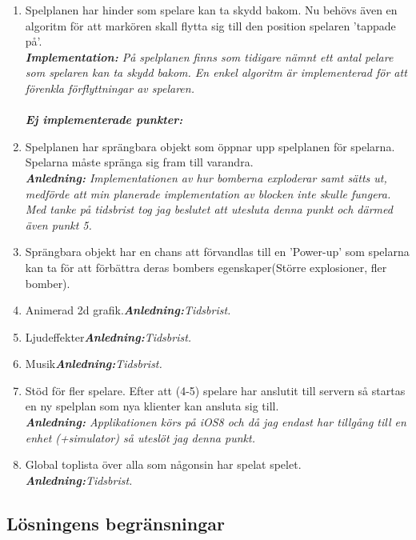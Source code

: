 \documentclass[10pt, titlepage, oneside, a4paper]{article}
\begin{document}
\begin{enumerate}
			
			\item Spelplanen har hinder som spelare kan ta skydd bakom. Nu behövs även en algoritm för att markören skall flytta sig till den position spelaren 'tappade på'.\\\textit{\textbf{Implementation:} På spelplanen finns som tidigare nämnt ett antal pelare som spelaren kan ta skydd bakom. En enkel algoritm är implementerad för att förenkla förflyttningar av spelaren.}
			\\\\\textit{\textbf{Ej implementerade punkter:}}
			\item Spelplanen har sprängbara objekt som öppnar upp spelplanen för spelarna. Spelarna måste spränga sig fram till varandra.\\\textit{\textbf{Anledning:} Implementationen av hur bomberna exploderar samt sätts ut, medförde att min planerade implementation av blocken inte skulle fungera. Med tanke på tidsbrist tog jag beslutet att utesluta denna punkt och därmed även punkt 5.}
			\item Sprängbara objekt har en chans att förvandlas till en 'Power-up' som spelarna kan ta för att förbättra deras bombers egenskaper(Större explosioner, fler bomber).
			\item Animerad 2d grafik.\textit{\textbf{Anledning:}Tidsbrist.}
			\item Ljudeffekter\textit{\textbf{Anledning:}Tidsbrist.}
			\item Musik\textit{\textbf{Anledning:}Tidsbrist.}
			\item Stöd för fler spelare. Efter att (4-5) spelare har anslutit till servern så startas en ny spelplan som nya klienter kan ansluta sig till.\\\textit{\textbf{Anledning:} Applikationen körs på iOS8 och då jag endast har tillgång till en enhet (+simulator) så uteslöt jag denna punkt.}
			\item Global toplista över alla som någonsin har spelat spelet.\\\textit{\textbf{Anledning:}Tidsbrist.}
		\end{enumerate}
		
		\newpage
    	\subsection{Lösningens begränsningar}
\end{document}
